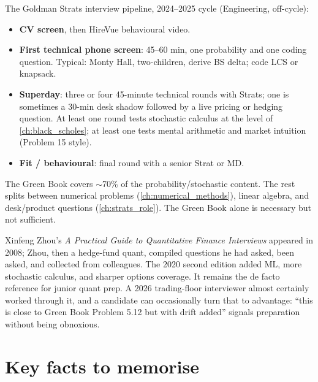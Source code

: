 \begin{gsbox}
The Goldman Strats interview pipeline, 2024--2025 cycle
(Engineering, off-cycle):
\begin{itemize}
  \item \textbf{CV screen}, then HireVue behavioural video.
  \item \textbf{First technical phone screen}: 45--60 min, one
    probability and one coding question.  Typical: Monty Hall,
    two-children, derive BS delta; code LCS or knapsack.
  \item \textbf{Superday}: three or four 45-minute technical
    rounds with Strats; one is sometimes a 30-min desk shadow
    followed by a live pricing or hedging question.  At least
    one round tests stochastic calculus at the level of
    \cref{ch:black_scholes}; at least one tests mental arithmetic
    and market intuition (Problem 15 style).
  \item \textbf{Fit / behavioural}: final round with a senior
    Strat or MD.
\end{itemize}
The Green Book \citeGreenBook{} covers $\sim$70\% of the
probability/stochastic content.  The rest splits between numerical
problems (\cref{ch:numerical_methods}), linear algebra, and
desk/product questions (\cref{ch:strats_role}).  The Green Book
alone is necessary but not sufficient.
\end{gsbox}

\begin{historybox}[title={The Green Book}]
Xinfeng Zhou's \emph{A Practical Guide to Quantitative Finance
Interviews} appeared in 2008; Zhou, then a hedge-fund quant,
compiled questions he had asked, been asked, and collected from
colleagues.  The 2020 second edition added ML, more stochastic
calculus, and sharper options coverage.  It remains the de facto
reference for junior quant prep.  A 2026 trading-floor
interviewer almost certainly worked through it, and a candidate
can occasionally turn that to advantage: ``this is close to Green
Book Problem 5.12 but with drift added'' signals preparation
without being obnoxious.
\end{historybox}

\section*{Key facts to memorise}

